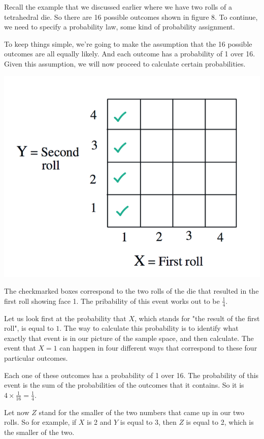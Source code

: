\documentclass{tufte-handout}
\begin{document}
Recall the example that we discussed earlier where
we have two rolls of a tetrahedral die. So there are 16 possible outcomes shown in figure 8. To
continue, we need to specify a probability law, some kind of probability assignment.

To keep things simple, we're going to make the assumption that the 16 possible outcomes are all
equally likely. And each outcome has a probability of 1 over 16. Given this assumption, we will now
proceed to calculate certain probabilities.

\begin{marginfigure}
  \includegraphics{CheckMarkedDie}
  \caption{The checkmarked boxes correspond to the two rolls of the die that resulted in the first roll showing face 1.  The pribability of this event works out to be $\frac{1}{4}.$}
\end{marginfigure}


Let us look first at the probability that $X$, which stands for "the result of the first roll", is equal to $1$. The way to
calculate this probability is to identify what exactly that event is in our picture of the sample space, and
then calculate. The event that $X = 1$ can happen in four different ways that correspond to these
four particular outcomes.

Each one of these outcomes has a probability of 1 over 16. The probability of this event is the sum of
the probabilities of the outcomes that it contains. So it is $4 \times \frac{1} {16} = \frac{1} {4}.$

\vspace{3.4cm}
Let now $Z$ stand for the smaller of the two numbers that came up in our two rolls. So for example, if $X$ is
2 and $Y$ is equal to 3, then $Z$ is equal to 2, which is the smaller of the two. 
\end{document}
